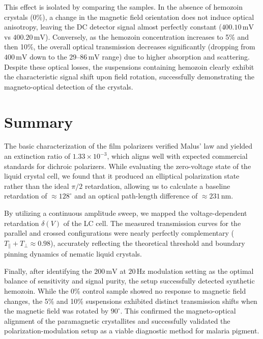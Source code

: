 \documentclass[12pt,a4paper]{article}
\begin{document}
This effect is isolated by comparing the samples. In the absence of hemozoin crystals (0\%), a change in the magnetic field orientation does not induce optical anisotropy, leaving the DC detector signal almost perfectly constant (\(400.10\,\mathrm{mV}\) vs \(400.20\,\mathrm{mV}\)). Conversely, as the hemozoin concentration increases to 5\% and then 10\%, the overall optical transmission decreases significantly (dropping from \(400\,\mathrm{mV}\) down to the \(29\)--\(86\,\mathrm{mV}\) range) due to higher absorption and scattering. Despite these optical losses, the suspensions containing hemozoin clearly exhibit the characteristic signal shift upon field rotation, successfully demonstrating the magneto-optical detection of the crystals.








\section{Summary}

The basic characterization of the film polarizers verified Malus' law and yielded an extinction ratio of \(1.33 \times 10^{-3}\), which aligns well with expected commercial standards for dichroic polarizers\cite{thorlabs_film_polarizers}. While evaluating the zero-voltage state of the liquid crystal cell, we found that it produced an elliptical polarization state rather than the ideal \(\pi/2\) retardation, allowing us to calculate a baseline retardation of \(\approx 128^\circ\) and an optical path-length difference of \(\approx 231\,\mathrm{nm}\).

By utilizing a continuous amplitude sweep, we mapped the voltage-dependent retardation \(\delta(V)\) of the LC cell. The measured transmission curves for the parallel and crossed configurations were nearly perfectly complementary (\(T_\parallel + T_\perp \approx 0.98\)), accurately reflecting the theoretical threshold and boundary pinning dynamics of nematic liquid crystals. 

Finally, after identifying the \(200\,\mathrm{mV}\) at \(20\,\mathrm{Hz}\) modulation setting as the optimal balance of sensitivity and signal purity, the setup successfully detected synthetic hemozoin. While the 0\% control sample showed no response to magnetic field changes, the 5\% and 10\% suspensions exhibited distinct transmission shifts when the magnetic field was rotated by \(90^\circ\). This confirmed the magneto-optical alignment of the paramagnetic crystallites and successfully validated the polarization-modulation setup as a viable diagnostic method for malaria pigment.
\end{document}
